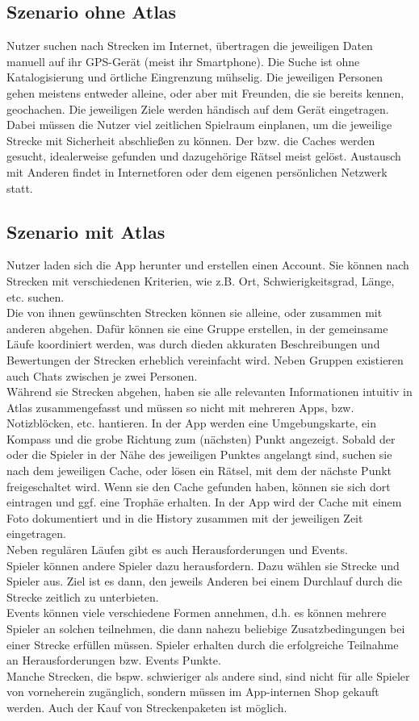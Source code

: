 \documentclass[a4paper, 12pt]{article}
\begin{document}
\subsection{Szenario ohne Atlas}
Nutzer suchen nach Strecken im Internet, übertragen die jeweiligen Daten manuell auf ihr GPS-Gerät (meist ihr Smartphone). Die Suche ist ohne Katalogisierung und örtliche Eingrenzung mühselig. Die jeweiligen Personen gehen meistens entweder alleine, oder aber mit Freunden, die sie bereits kennen, geochachen. Die jeweiligen Ziele werden händisch auf dem Gerät eingetragen. Dabei müssen die Nutzer viel zeitlichen Spielraum einplanen, um die jeweilige Strecke mit Sicherheit abschließen zu können. Der bzw. die Caches werden gesucht, idealerweise gefunden und dazugehörige Rätsel meist gelöst.
Austausch mit Anderen findet in Internetforen oder dem eigenen persönlichen Netzwerk statt.
\subsection{Szenario mit Atlas}
Nutzer laden sich die App herunter und erstellen einen Account.
Sie können nach Strecken mit verschiedenen Kriterien, wie z.B. Ort, Schwierigkeitsgrad, Länge, etc. suchen. \\
Die von ihnen gewünschten Strecken können sie alleine, oder zusammen mit anderen abgehen. Dafür können sie eine Gruppe erstellen, in der gemeinsame Läufe koordiniert werden, was durch dieden akkuraten Beschreibungen und Bewertungen der Strecken erheblich vereinfacht wird. Neben Gruppen existieren auch Chats zwischen je zwei Personen.\\
Während sie Strecken abgehen, haben sie alle relevanten Informationen intuitiv in Atlas zusammengefasst und müssen so nicht mit mehreren Apps, bzw. Notizblöcken, etc. hantieren. In der App werden eine Umgebungskarte, ein Kompass und die grobe Richtung zum (nächsten) Punkt angezeigt. Sobald der oder die Spieler in der Nähe des jeweiligen Punktes angelangt sind, suchen sie nach dem jeweiligen Cache, oder lösen ein Rätsel, mit dem der nächste Punkt freigeschaltet wird. Wenn sie den Cache gefunden haben, können sie sich dort eintragen und ggf. eine Trophäe erhalten. In der App wird der Cache mit einem Foto dokumentiert und in die History zusammen mit der jeweiligen Zeit eingetragen.\\
Neben regulären Läufen gibt es auch Herausforderungen und Events.\\
Spieler können andere Spieler dazu herausfordern. Dazu wählen sie Strecke und Spieler aus. Ziel ist es dann, den jeweils Anderen bei einem Durchlauf durch die Strecke zeitlich zu unterbieten.\\
Events können viele verschiedene Formen annehmen, d.h. es können mehrere Spieler an solchen teilnehmen, die dann nahezu beliebige Zusatzbedingungen bei einer Strecke erfüllen müssen. Spieler erhalten durch die erfolgreiche Teilnahme an Herausforderungen bzw. Events Punkte.\\
Manche Strecken, die bspw. schwieriger als andere sind, sind nicht für alle Spieler von vorneherein zugänglich, sondern müssen im App-internen Shop gekauft werden. Auch der Kauf von Streckenpaketen ist möglich.\\
\\
\end{document}
